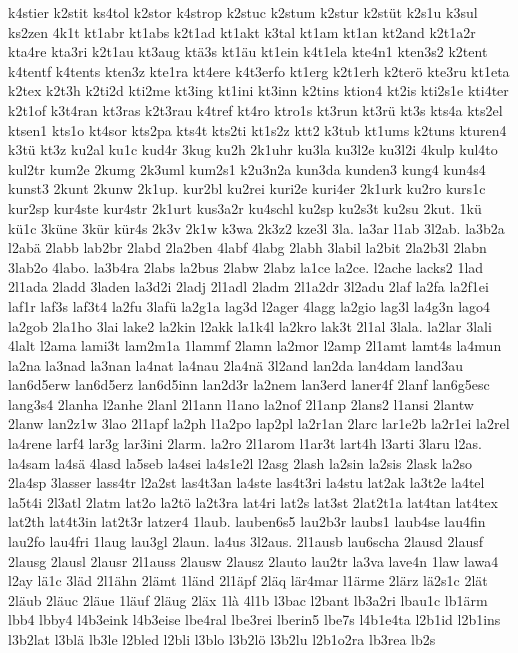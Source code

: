 {k4stier
k2stit
ks4tol
k2stor
k4strop
k2stuc
k2stum
k2stur
k2stüt
k2s1u
k3sul
ks2zen
4k1t
kt1abr
kt1abs
k2t1ad
kt1akt
k3tal
kt1am
kt1an
kt2and
k2t1a2r
kta4re
kta3ri
k2t1au
kt3aug
ktä3s
kt1äu
kt1ein
k4t1ela
kte4n1
kten3s2
k2tent
k4tentf
k4tents
kten3z
kte1ra
kt4ere
k4t3erfo
kt1erg
k2t1erh
k2terö
kte3ru
kt1eta
k2tex
k2t3h
k2ti2d
kti2me
kt3ing
kt1ini
kt3inn
k2tins
ktion4
kt2is
kti2s1e
kti4ter
k2t1of
k3t4ran
kt3ras
k2t3rau
k4tref
kt4ro
ktro1s
kt3run
kt3rü
kt3s
kts4a
kts2el
ktsen1
kts1o
kt4sor
kts2pa
kts4t
kts2ti
kt1s2z
ktt2
k3tub
kt1ums
k2tuns
kturen4
k3tü
kt3z
ku2al
ku1c
kud4r
3kug
ku2h
2k1uhr
ku3la
ku3l2e
ku3l2i
4kulp
kul4to
kul2tr
kum2e
2kumg
2k3uml
kum2s1
k2u3n2a
kun3da
kunden3
kung4
kun4s4
kunst3
2kunt
2kunw
2k1up.
kur2bl
ku2rei
kuri2e
kuri4er
2k1urk
ku2ro
kurs1c
kur2sp
kur4ste
kur4str
2k1urt
kus3a2r
ku4schl
ku2sp
ku2s3t
ku2su
2kut.
1kü
kü1c
3küne
3kür
kür4s
2k3v
2k1w
k3wa
2k3z2
kze3l
3la.
la3ar
l1ab
3l2ab.
la3b2a
l2abä
2labb
lab2br
2labd
2la2ben
4labf
4labg
2labh
3labil
la2bit
2la2b3l
2labn
3lab2o
4labo.
la3b4ra
2labs
la2bus
2labw
2labz
la1ce
la2ce.
l2ache
lacks2
1lad
2l1ada
2ladd
3laden
la3d2i
2ladj
2l1adl
2ladm
2l1a2dr
3l2adu
2laf
la2fa
la2f1ei
laf1r
laf3s
laf3t4
la2fu
3lafü
la2g1a
lag3d
l2ager
4lagg
la2gio
lag3l
la4g3n
lago4
la2gob
2la1ho
3lai
lake2
la2kin
l2akk
la1k4l
la2kro
lak3t
2l1al
3lala.
la2lar
3lali
4lalt
l2ama
lami3t
lam2m1a
1lammf
2lamn
la2mor
l2amp
2l1amt
lamt4s
la4mun
la2na
la3nad
la3nan
la4nat
la4nau
2la4nä
3l2and
lan2da
lan4dam
land3au
lan6d5erw
lan6d5erz
lan6d5inn
lan2d3r
la2nem
lan3erd
laner4f
2lanf
lan6g5esc
lang3s4
2lanha
l2anhe
2lanl
2l1ann
l1ano
la2nof
2l1anp
2lans2
l1ansi
2lantw
2lanw
lan2z1w
3lao
2l1apf
la2ph
l1a2po
lap2pl
la2r1an
2larc
lar1e2b
la2r1ei
la2rel
la4rene
larf4
lar3g
lar3ini
2larm.
la2ro
2l1arom
l1ar3t
lart4h
l3arti
3laru
l2as.
la4sam
la4sä
4lasd
la5seb
la4sei
la4s1e2l
l2asg
2lash
la2sin
la2sis
2lask
la2so
2la4sp
3lasser
lass4tr
l2a2st
las4t3an
la4ste
las4t3ri
la4stu
lat2ak
la3t2e
la4tel
la5t4i
2l3atl
2latm
lat2o
la2tö
la2t3ra
lat4ri
lat2s
lat3st
2lat2t1a
lat4tan
lat4tex
lat2th
lat4t3in
lat2t3r
latzer4
1laub.
lauben6s5
lau2b3r
laubs1
laub4se
lau4fin
lau2fo
lau4fri
1laug
lau3gl
2laun.
la4us
3l2aus.
2l1ausb
lau6scha
2lausd
2lausf
2lausg
2lausl
2lausr
2l1auss
2lausw
2lausz
2lauto
lau2tr
la3va
lave4n
1law
lawa4
l2ay
lä1c
3läd
2l1ähn
2lämt
1länd
2l1äpf
2läq
lär4mar
l1ärme
2lärz
lä2s1c
2lät
2läub
2läuc
2läue
1läuf
2läug
2läx
1là
4l1b
l3bac
l2bant
lb3a2ri
lbau1c
lb1ärm
lbb4
lbby4
l4b3eink
l4b3eise
lbe4ral
lbe3rei
lberin5
lbe7s
l4b1e4ta
l2b1id
l2b1ins
l3b2lat
l3blä
lb3le
l2bled
l2bli
l3blo
l3b2lö
l3b2lu
l2b1o2ra
lb3rea
lb2s
}

